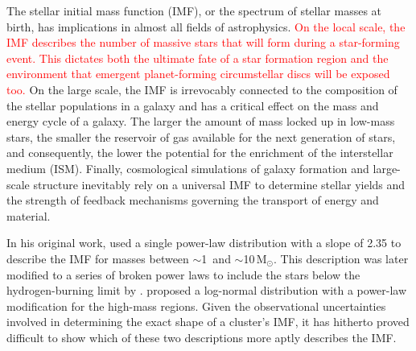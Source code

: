 \documentclass{aa}
\newcommand{\msune}{M$_\odot$}
\newcommand{\s}{$\sim$}
\newcommand{\langedit}[1]{\textcolor{red}{#1}}
\begin{document}
The stellar initial mass function (IMF), or the spectrum of stellar masses at birth, has implications in almost all fields of astrophysics.
\langedit{On the local scale, the IMF describes the number of massive stars that will form during a star-forming event.
This dictates both the ultimate fate of a star formation region and the environment that emergent planet-forming circumstellar discs will be exposed too.}
On the large scale, the IMF is irrevocably connected to the composition of the stellar populations in a galaxy and has a critical effect on the mass and energy cycle of a galaxy.
The larger the amount of mass locked up in low-mass stars, the smaller the reservoir of gas available for the next generation of stars, and consequently, the lower the potential for the enrichment of the interstellar medium (ISM).
Finally, cosmological simulations of galaxy formation and large-scale structure inevitably rely on a universal IMF to determine stellar yields and the strength of feedback mechanisms governing the transport of energy and material.

In his original work, \citet{salpeter1955} used a single power-law distribution with a slope of 2.35 to describe the IMF for masses between \s1\ and \s10\,\msune.
This description was later modified to a series of broken power laws to include the stars below the hydrogen-burning limit by \citet{kroupa2001}\@.
\citet{chabrier2003, Chabrier2005} proposed a log-normal distribution with a power-law modification for the high-mass regions.
Given the observational uncertainties involved in determining the exact shape of a cluster's IMF, it has hitherto proved difficult to show which of these two descriptions more aptly describes the IMF\@.
\end{document}
